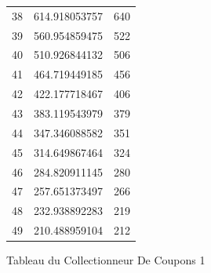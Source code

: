 \documentclass[10pt,a4paper]{article}
\begin{document}
\begin{figure}[h]
\begin{tabular}{|r|r|r|}
38 & 614.918053757 & 640\\
39 & 560.954859475 & 522\\
40 & 510.926844132 & 506\\
41 & 464.719449185 & 456\\
42 & 422.177718467 & 406\\
43 & 383.119543979 & 379\\
44 & 347.346088582 & 351\\
45 & 314.649867464 & 324\\
46 & 284.820911145 & 280\\
47 & 257.651373497 & 266\\
48 & 232.938892283 & 219\\
49 & 210.488959104 & 212\\
\hline
\end{tabular}
\caption{Tableau du Collectionneur De Coupons 1}
	\end{figure}

\newpage
\end{document}
